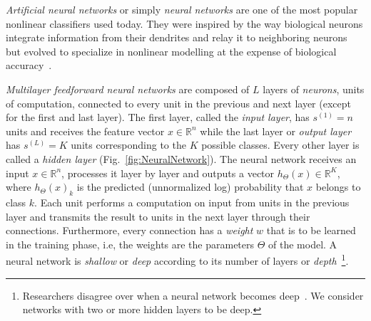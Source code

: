 \emph{Artificial neural networks} or simply \emph{neural networks} are one of the most popular nonlinear classifiers used today. They were inspired by the way biological neurons integrate information from their dendrites and relay it to neighboring neurons~\cite{McCulloch1943, Widrow1960, Rosenblatt1962} but evolved to specialize in nonlinear modelling at the expense of biological accuracy~\cite{Rumelhart1986}.%

\emph{Multilayer feedforward neural networks} are composed of $L$ layers of \emph{neurons}, units of computation,
connected to every unit in the previous and next layer (except for the first and last layer).
The first layer, called the \emph{input layer}, has $s^{(1)} = n$ units and receives the feature vector $x \in \mathbb{R}^n$ while the last layer or \emph{output layer} has $s^{(L)} = K$ units corresponding to the $K$ possible classes. Every other layer is called a \emph{hidden layer} (Fig.~\ref{fig:NeuralNetwork}). The neural network receives an input $x \in \mathbb{R}^n$, processes it layer by layer and outputs a vector $h_\Theta(x) \in \mathbb{R}^K$, where $h_\Theta(x)_k$ is the predicted (unnormalized log) probability that $x$ belongs to class $k$. Each unit performs a computation on input from units in the previous layer and transmits the result to units in the next layer through their connections. Furthermore, every connection has a \emph{weight} $w$ that is to be learned in the training phase, i.e, the weights are the parameters $\Theta$ of the model. A neural network is \emph{shallow} or \emph{deep} according to its number of layers or \emph{depth}~\footnote{Researchers disagree over when a neural network becomes deep~\cite{Schmidhuber2015}. We consider networks with two or more hidden layers to be deep.}.

